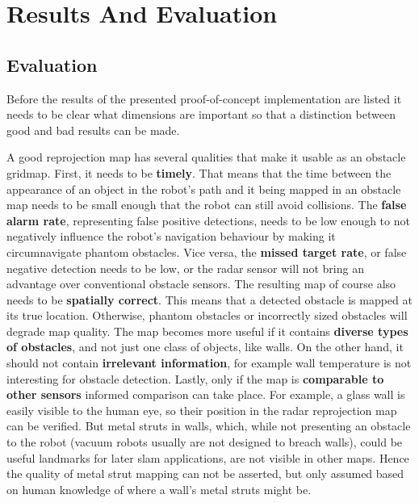 \chapter{Results And Evaluation}\label{results-and-evaluation}

\section{Evaluation}\label{evaluation}

Before the results of the presented proof-of-concept implementation are listed it needs to be clear what dimensions are important so that a distinction between good and bad results can be made.

A good reprojection map has several qualities that make it usable as an obstacle gridmap. First, it needs to be \textbf{timely}. That means that the time between the appearance of an object in the robot's path and it being mapped in an obstacle map needs to be small enough that the robot can still avoid collisions. The \textbf{false alarm rate}, representing false positive detections, needs to be low enough to not negatively influence the robot's navigation behaviour by making it circumnavigate phantom obstacles. Vice versa, the \textbf{missed target rate}, or false negative detection needs to be low, or the radar sensor will not bring an advantage over conventional obstacle sensors. The resulting map of course also needs to be \textbf{spatially correct}. This means that a detected obstacle is mapped at its true location. Otherwise, phantom obstacles or incorrectly sized obstacles will degrade map quality. The map becomes more useful if it contains \textbf{diverse types of obstacles}, and not just one class of objects, like walls. On the other hand, it should not contain \textbf{irrelevant information}, for example wall temperature is not interesting for obstacle detection. Lastly, only if the map is \textbf{comparable to other sensors} informed comparison can take place. For example, a glass wall is easily visible to the human eye, so their position in the radar reprojection map can be verified. But metal struts in walls, which, while not presenting an obstacle to the robot (vacuum robots usually are not designed to breach walls), could be useful landmarks for later slam applications, are not visible in other maps. Hence the quality of metal strut mapping can not be asserted, but only assumed based on human knowledge of where a wall's metal struts might be.

